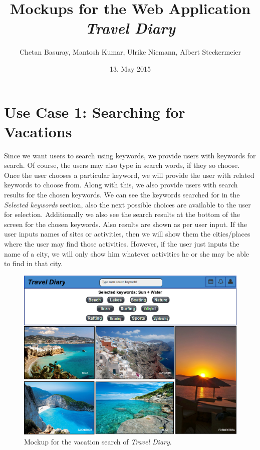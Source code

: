 \documentclass[IN,english]{tumbook}
\title{Mockups for the Web Application \emph{Travel Diary}}
\author{Chetan Basuray, Mantosh Kumar, Ulrike Niemann, Albert Steckermeier}
\date{13. May 2015}
\begin{document}
\maketitle
\newpage
\tableofcontents
\newpage

\chapter{Use Case 1: Searching for Vacations}

Since we want users to search using keywords, we provide users with keywords for search. Of course, the users may also type in search words, if they so choose. Once the user chooses a particular keyword, we will provide the user with related keywords to choose from. Along with this, we also provide users with search results for the chosen keywords. We can see the keywords searched for in the \emph{Selected keywords} section, also the next possible choices are available to the user for selection. Additionally we also see the search results at the bottom of the screen for the chosen keywords. Also results are shown as per user input. If the user inputs names of sites or activities, then we will show them the cities/places where the user may find those activities. However, if the user just inputs the name of a city, we will only show him whatever activities he or she may be able to find in that city.

\begin{figure}[h]
	\begin{center}
		\includegraphics[width=\textwidth]{graphics/usecase1}
	\end{center}
	\label{fig:usecase1}
	\caption{Mockup for the vacation search of \emph{Travel Diary}.}
\end{figure}
\end{document}
